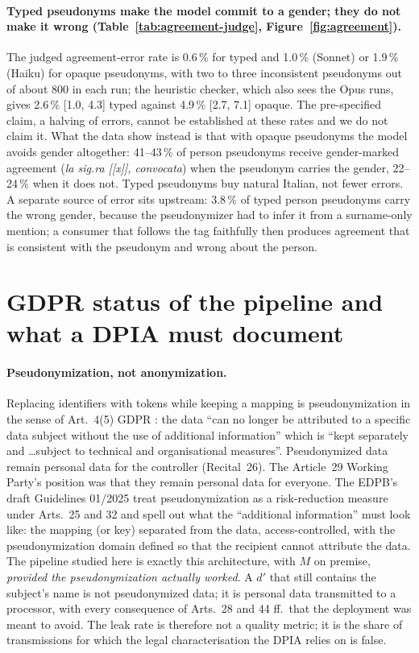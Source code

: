 \documentclass[11pt,a4paper]{article}
\newcommand{\dprime}{d'}
\begin{document}
\paragraph{Typed pseudonyms make the model commit to a gender; they do not make it wrong (Table~\ref{tab:agreement-judge}, Figure~\ref{fig:agreement}).} The judged agreement-error rate is 0.6\,\% for typed and 1.0\,\% (Sonnet) or 1.9\,\% (Haiku) for opaque pseudonyms, with two to three inconsistent pseudonyms out of about 800 in each run; the heuristic checker, which also sees the Opus runs, gives 2.6\,\% [1.0, 4.3] typed against 4.9\,\% [2.7, 7.1] opaque. The pre-specified claim, a halving of errors, cannot be established at these rates and we do not claim it. What the data show instead is that with opaque pseudonyms the model avoids gender altogether: 41--43\,\% of person pseudonyms receive gender-marked agreement (\emph{la sig.ra [[x]], convocata}) when the pseudonym carries the gender, 22--24\,\% when it does not. Typed pseudonyms buy natural Italian, not fewer errors. A separate source of error sits upstream: 3.8\,\% of typed person pseudonyms carry the wrong gender, because the pseudonymizer had to infer it from a surname-only mention; a consumer that follows the tag faithfully then produces agreement that is consistent with the pseudonym and wrong about the person.

\clearpage
\section{GDPR status of the pipeline and what a DPIA must document}
\label{sec:gdpr}

\paragraph{Pseudonymization, not anonymization.} Replacing identifiers with tokens while keeping a mapping is pseudonymization in the sense of Art.~4(5) GDPR \citep{gdpr2016}: the data ``can no longer be attributed to a specific data subject without the use of additional information'' which is ``kept separately and \ldots subject to technical and organisational measures''. Pseudonymized data remain personal data for the controller (Recital~26). The Article~29 Working Party's position \citep{wp29anon2014} was that they remain personal data for everyone. The EDPB's draft Guidelines 01/2025 \citep{edpb2025pseudonymisation} treat pseudonymization as a risk-reduction measure under Arts.~25 and 32 and spell out what the ``additional information'' must look like: the mapping (or key) separated from the data, access-controlled, with the pseudonymization domain defined so that the recipient cannot attribute the data. The pipeline studied here is exactly this architecture, with $M$ on premise, \emph{provided the pseudonymization actually worked}. A $\dprime$ that still contains the subject's name is not pseudonymized data; it is personal data transmitted to a processor, with every consequence of Arts.~28 and 44 ff.\ that the deployment was meant to avoid. The leak rate is therefore not a quality metric; it is the share of transmissions for which the legal characterisation the DPIA relies on is false.
\end{document}
